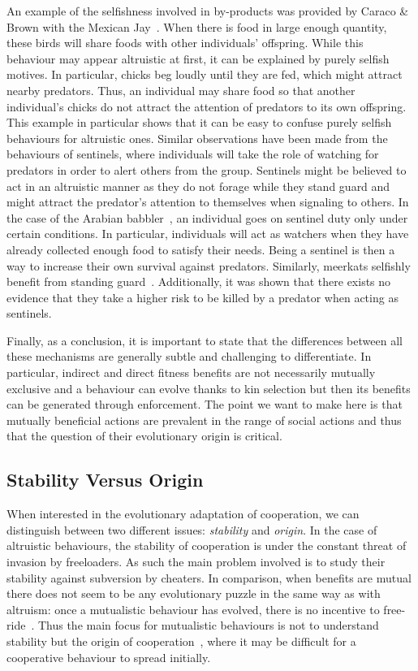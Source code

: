     An example of the selfishness involved in by-products was provided by Caraco \& Brown with the Mexican Jay~\parencite{Caraco1986, Dugatkin2002}. When there is food in large enough quantity, these birds will share foods with other individuals' offspring. While this behaviour may appear altruistic at first, it can be explained by purely selfish motives. In particular, chicks beg loudly until they are fed, which might attract nearby predators. Thus, an individual may share food so that another individual's chicks do not attract the attention of predators to its own offspring. This example in particular shows that it can be easy to confuse purely selfish behaviours for altruistic ones. Similar observations have been made from the behaviours of sentinels, where individuals will take the role of watching for predators in order to alert others from the group. Sentinels might be believed to act in an altruistic manner as they do not forage while they stand guard and might attract the predator's attention to themselves when signaling to others. In the case of the Arabian babbler~\parencite{Wright2001}, an individual goes on sentinel duty only under certain conditions. In particular, individuals will act as watchers when they have already collected enough food to satisfy their needs. Being a sentinel is then a way to increase their own survival against predators. Similarly, meerkats selfishly benefit from standing guard~\parencite{CluttonBrock1999}. Additionally, it was shown that there exists no evidence that they take a higher risk to be killed by a predator when acting as sentinels.

    Finally, as a conclusion, it is important to state that the differences between all these mechanisms are generally subtle and challenging to differentiate. In particular, indirect and direct fitness benefits are not necessarily mutually exclusive and a behaviour can evolve thanks to kin selection but then its benefits can be generated through 
    enforcement. The point we want to make here is that mutually beneficial actions are prevalent in the range of social actions and thus that the question of their evolutionary origin is critical.
    

  \subsection{Stability Versus Origin}

    When interested in the evolutionary adaptation of cooperation, we can distinguish between two different issues: \emph{stability} and \emph{origin}. In the case of altruistic behaviours, the stability of cooperation is under the constant threat of invasion by freeloaders. As such the main problem involved is to study their stability against subversion by cheaters. In comparison, when benefits are mutual there does not seem to be any evolutionary puzzle in the same way as with altruism: once a mutualistic behaviour has evolved, there is no incentive to free-ride~\parencite{Forber2015}. Thus the main focus for mutualistic behaviours is not to understand stability but the origin of cooperation~\parencite{West2007}, where it may be difficult for a cooperative behaviour to spread initially. 

